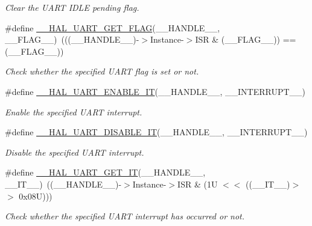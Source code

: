 \begin{DoxyCompactItemize}
\begin{DoxyCompactList}\small\item\em Clear the U\+A\+RT I\+D\+LE pending flag. \end{DoxyCompactList}\item 
\#define \hyperlink{group___u_a_r_t___exported___macros_ga261fe8a2afe84ec048113654266c5bf6}{\+\_\+\+\_\+\+H\+A\+L\+\_\+\+U\+A\+R\+T\+\_\+\+G\+E\+T\+\_\+\+F\+L\+AG}(\+\_\+\+\_\+\+H\+A\+N\+D\+L\+E\+\_\+\+\_\+,  \+\_\+\+\_\+\+F\+L\+A\+G\+\_\+\+\_\+)~(((\+\_\+\+\_\+\+H\+A\+N\+D\+L\+E\+\_\+\+\_\+)-\/$>$Instance-\/$>$I\+SR \& (\+\_\+\+\_\+\+F\+L\+A\+G\+\_\+\+\_\+)) == (\+\_\+\+\_\+\+F\+L\+A\+G\+\_\+\+\_\+))
\begin{DoxyCompactList}\small\item\em Check whether the specified U\+A\+RT flag is set or not. \end{DoxyCompactList}\item 
\#define \hyperlink{group___u_a_r_t___exported___macros_gaba94165ed584d49c1ec12df9819bd4bb}{\+\_\+\+\_\+\+H\+A\+L\+\_\+\+U\+A\+R\+T\+\_\+\+E\+N\+A\+B\+L\+E\+\_\+\+IT}(\+\_\+\+\_\+\+H\+A\+N\+D\+L\+E\+\_\+\+\_\+,  \+\_\+\+\_\+\+I\+N\+T\+E\+R\+R\+U\+P\+T\+\_\+\+\_\+)
\begin{DoxyCompactList}\small\item\em Enable the specified U\+A\+RT interrupt. \end{DoxyCompactList}\item 
\#define \hyperlink{group___u_a_r_t___exported___macros_ga3c29b33f38658acbf592e9aaf84c6f33}{\+\_\+\+\_\+\+H\+A\+L\+\_\+\+U\+A\+R\+T\+\_\+\+D\+I\+S\+A\+B\+L\+E\+\_\+\+IT}(\+\_\+\+\_\+\+H\+A\+N\+D\+L\+E\+\_\+\+\_\+,  \+\_\+\+\_\+\+I\+N\+T\+E\+R\+R\+U\+P\+T\+\_\+\+\_\+)
\begin{DoxyCompactList}\small\item\em Disable the specified U\+A\+RT interrupt. \end{DoxyCompactList}\item 
\#define \hyperlink{group___u_a_r_t___exported___macros_ga39db42da556cc45d0bf2ab80a3894985}{\+\_\+\+\_\+\+H\+A\+L\+\_\+\+U\+A\+R\+T\+\_\+\+G\+E\+T\+\_\+\+IT}(\+\_\+\+\_\+\+H\+A\+N\+D\+L\+E\+\_\+\+\_\+,  \+\_\+\+\_\+\+I\+T\+\_\+\+\_\+)~((\+\_\+\+\_\+\+H\+A\+N\+D\+L\+E\+\_\+\+\_\+)-\/$>$Instance-\/$>$I\+SR \& (1\+U $<$$<$ ((\+\_\+\+\_\+\+I\+T\+\_\+\+\_\+)$>$$>$ 0x08\+U)))
\begin{DoxyCompactList}\small\item\em Check whether the specified U\+A\+RT interrupt has occurred or not. \end{DoxyCompactList}\item 

\end{DoxyCompactItemize}
